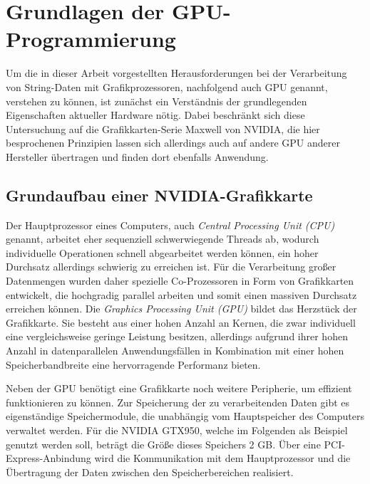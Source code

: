 \chapter{Grundlagen der GPU-Programmierung}

Um die in dieser Arbeit vorgestellten Herausforderungen bei der Verarbeitung von String-Daten mit Grafikprozessoren, nachfolgend auch GPU genannt, verstehen zu können, ist zunächst ein Verständnis der grundlegenden Eigenschaften aktueller Hardware nötig.
Dabei beschränkt sich diese Untersuchung auf die Grafikkarten-Serie Maxwell von NVIDIA, die hier besprochenen Prinzipien lassen sich allerdings auch auf andere GPU anderer Hersteller übertragen und finden dort ebenfalls Anwendung.

\section{Grundaufbau einer NVIDIA-Grafikkarte}

Der Hauptprozessor eines Computers, auch \emph{Central Processing Unit (CPU)} genannt, arbeitet eher sequenziell schwerwiegende Threads ab, wodurch individuelle Operationen schnell abgearbeitet werden können, ein hoher Durchsatz allerdings schwierig zu erreichen ist.
Für die Verarbeitung großer Datenmengen wurden daher spezielle Co-Prozessoren in Form von Grafikkarten entwickelt, die hochgradig parallel arbeiten und somit einen massiven Durchsatz erreichen können.
Die \emph{Graphics Processing Unit (GPU)} bildet das Herzstück der Grafikkarte.
Sie besteht aus einer hohen Anzahl an Kernen, die zwar individuell eine vergleichsweise geringe Leistung besitzen, allerdings aufgrund ihrer hohen Anzahl in datenparallelen Anwendungsfällen in Kombination mit einer hohen Speicherbandbreite eine hervorragende Performanz bieten.

Neben der GPU benötigt eine Grafikkarte noch weitere Peripherie, um effizient funktionieren zu können.
Zur Speicherung der zu verarbeitenden Daten gibt es eigenständige Speichermodule, die unabhängig vom Hauptspeicher des Computers verwaltet werden.
Für die NVIDIA GTX950, welche im Folgenden als Beispiel genutzt werden soll, beträgt die Größe dieses Speichers 2 GB.
Über eine PCI-Express-Anbindung wird die Kommunikation mit dem Hauptprozessor und die Übertragung der Daten zwischen den Speicherbereichen realisiert.


